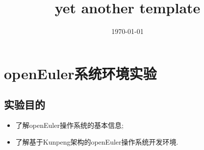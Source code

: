 \documentclass[forprint]{plainAssign}
\begin{document}


\title{yet another template} %
\date{\today} %


\maketitle
\frontmatter
{}              %


\tableofcontents




\mainmatter %
\pagestyle{plain}%
\baselineskip=23pt  %



\chapter{openEuler系统环境实验}
 
 \section{实验目的}
\begin{itemize}
	\item 了解openEuler操作系统的基本信息;
	\item 了解基于Kunpeng架构的openEuler操作系统开发环境. 
\end{itemize}
\end{document}
